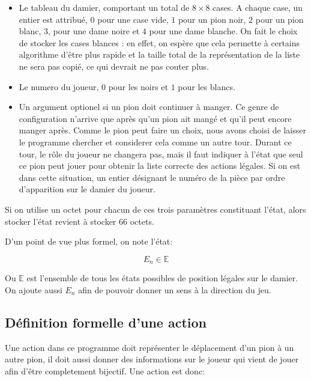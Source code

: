 \documentclass[a4paper,11pt]{article}
\begin{document}
\begin{multicols}{2}[]
    \begin{itemize} 
      \item Le tableau du damier, comportant un total de $8 \times 8$ cases. A
        chaque case, un entier est attribué, $0$ pour une case vide, $1$ pour
        un pion noir, $2$ pour un pion blanc, $3$, pour une dame noire et $4$
        pour une dame blanche. On fait le choix de stocker les cases blances :
        en effet, on espère que cela permette à certains algorithme d'être plus
        rapide et la taille total de la représentation de la liste ne sera pas
        copié, ce qui devrait ne pas couter plus.  
      \item Le numero du joueur, $0$ pour les noirs et $1$ pour les blancs.
      \item Un argument optionel si un pion doit continuer à manger. Ce genre
        de configuration n'arrive que après qu'un pion ait mangé et qu'il peut
        encore manger après. Comme le pion peut faire un choix, nous avons
        choisi de laisser le programme chercher et considerer cela comme un
        autre tour.  Durant ce tour, le rôle du joueur ne changera pas, mais il
        faut indiquer à l'état que seul ce pion peut jouer pour obtenir la
        liste correcte des actions légales. Si on est dans cette situation, un
        entier désignant le numéro de la pièce par ordre d'apparition sur le
        damier du joueur.
    \end{itemize}

    Si on utilise un octet pour chacun de ces trois paramètres constituant
    l'état, alors stocker l'état revient à stocker 66 octets.


    D'un point de vue plus formel, on note l'état: 

    \[ E_{n} \in \mathbb{E} \]

    Ou $\mathbb{E}$ est l'ensemble de tous les états possibles de position
    légales sur le damier. On ajoute aussi $E_{n}$ afin de pouvoir donner un
    sens à la direction du jeu.

  \subsection{Définition formelle d'une action}

    Une action dans ce programme doit représenter le déplacement d'un pion à un
    autre pion, il doit aussi donner des informations sur le joueur qui vient de
    jouer afin d'être completement bijectif. Une action est donc:


\end{multicols}
\end{document}
